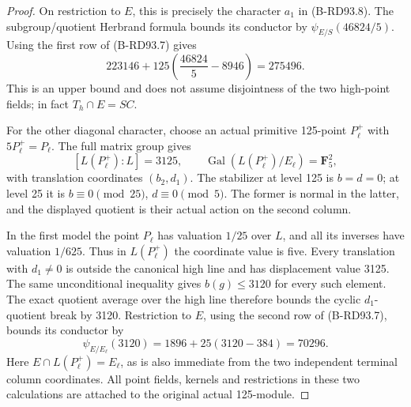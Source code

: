 \begin{proof}
On restriction to \(E\), this is precisely the character
\(a_1\) in (B-RD93.8). The subgroup/quotient Herbrand formula
bounds its conductor by \(\psi_{E/S}(46824/5)\).
Using the first row of (B-RD93.7) gives
\[
 223146+125\left(\frac{46824}{5}-8946\right)=275496.
                                                               \tag{B-RD93.13}
\]
This is an upper bound and does not assume disjointness of
the two high-point fields; in fact \(T_h\cap E=SC\).

For the other diagonal character, choose an actual primitive
125-point \(P_\ell^+\) with \(5P_\ell^+=P_\ell\).
The full matrix group gives
\[
 [L(P_\ell^+):L]=3125,\qquad
 \operatorname{Gal}(L(P_\ell^+)/E_\ell)=\mathbf F_5^2,
                                                               \tag{B-RD93.14}
\]
with translation coordinates \((b_2,d_1)\). The stabilizer
at level 125 is \(b=d=0\); at level 25 it is
\(b\equiv0\pmod {25}\), \(d\equiv0\pmod5\).
The former is normal in the latter, and the displayed
quotient is their actual action on the second column.

In the first model the point \(P_\ell\) has valuation
\(1/25\) over \(L\), and all its inverses have valuation
\(1/625\). Thus in \(L(P_\ell^+)\) the coordinate value
is five. Every translation with \(d_1\ne0\) is outside
the canonical high line and has displacement value 3125.
The same unconditional inequality gives \(b(g)\le3120\)
for every such element. The exact quotient average over
the high line therefore bounds the cyclic \(d_1\)-quotient
break by 3120. Restriction to \(E\), using the second row
of (B-RD93.7), bounds its conductor by
\[
 \psi_{E/E_\ell}(3120)
 =1896+25(3120-384)=70296.                              \tag{B-RD93.15}
\]
Here \(E\cap L(P_\ell^+)=E_\ell\), as is also immediate
from the two independent terminal column coordinates.
All point fields, kernels and restrictions in these two
calculations are attached to the original actual 125-module.
\end{proof}


